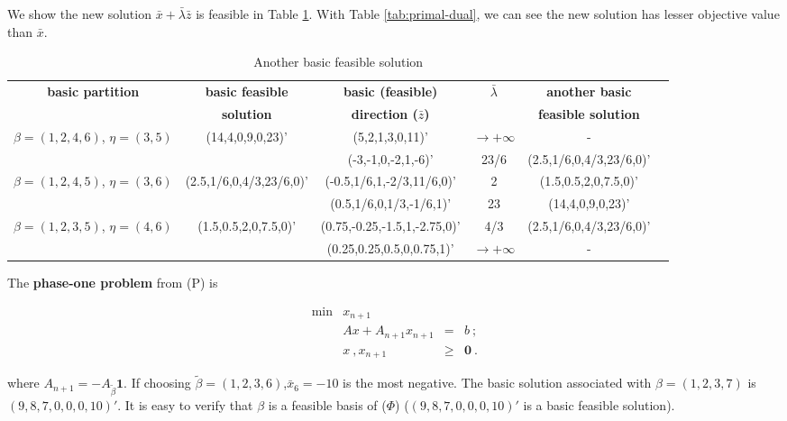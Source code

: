 We show the new solution $\bar{x}+\bar{\lambda}\bar{z}$ is feasible in Table \ref{tab:another-sol}. With Table \ref{tab:primal-dual}, we can see the new solution has lesser objective value than $\bar{x}$.

\begin{table}[!h]
\centering
\footnotesize
\begin{tabular}{|c|c|c|c|c|c|}\hline

\textbf{basic partition} & \textbf{basic feasible} & \textbf{basic (feasible)} & $\bar{\lambda}$ & \textbf{another basic} \\
&\textbf{solution} & \textbf{direction ($\bar{z}$)} & & \textbf{feasible solution} \\
\hline
$\beta = (1,2,4,6) $, $\eta = (3,5)$&(14,4,0,9,0,23)'&(5,2,1,3,0,11)'&$\to+\infty$&-\\
&&(-3,-1,0,-2,1,-6)'&23/6&(2.5,1/6,0,4/3,23/6,0)'\\\hline
$\beta = (1,2,4,5) $, $\eta = (3,6)$&(2.5,1/6,0,4/3,23/6,0)'&(-0.5,1/6,1,-2/3,11/6,0)'&2&(1.5,0.5,2,0,7.5,0)'\\
&&(0.5,1/6,0,1/3,-1/6,1)'&23&(14,4,0,9,0,23)'\\\hline
$\beta = (1,2,3,5) $, $\eta = (4,6)$&(1.5,0.5,2,0,7.5,0)'&(0.75,-0.25,-1.5,1,-2.75,0)'&4/3&(2.5,1/6,0,4/3,23/6,0)'\\
&&(0.25,0.25,0.5,0,0.75,1)'&$\to+\infty$&-\\\hline
\end{tabular}
\caption{Another basic feasible solution}
\label{tab:another-sol}
\end{table}

The \textbf{phase-one problem} from (P) is

\[
\tag{$\Phi$}
\begin{array}{rrcl}
 \min & x_{n+1}  &      &   \\
      &  Ax  + A_{n+1}x_{n+1} &   =  & b~; \\
      &   x~, x_{n+1}  & \geq & \mathbf{0}~.
\end{array}
\]

where $A_{n+1} = -A_{\tilde{\beta}}\mathbf{1}$. If choosing $\tilde{\beta} = (1,2,3,6)$,$\bar{x}_6=-10$ is the most negative. The basic solution associated with $\beta = (1,2,3,7) $ is $(9,8,7,0,0,0,10)'$. It is easy to verify that $\beta $ is a feasible basis of ($\Phi$) ($(9,8,7,0,0,0,10)'$ is a basic feasible solution).